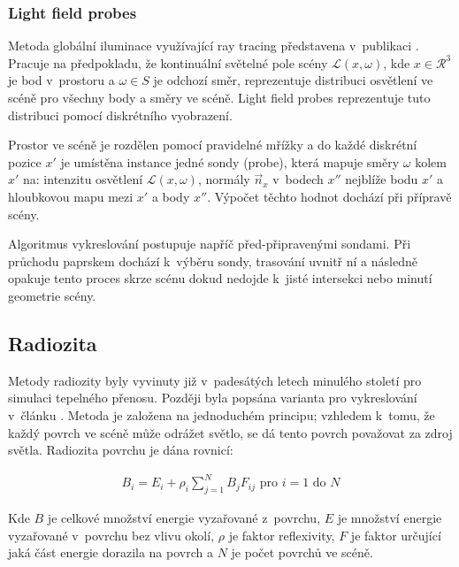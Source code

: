 \subsubsection{Light field probes} \label{sec:light_field_probes}
Metoda globální iluminace využívající ray tracing představena v~publikaci \cite{light_field_probes}. Pracuje na předpokladu, že kontinuální světelné pole scény $\mathcal{L}(x, \omega)$, kde $x \in \mathcal{R}^3$ je bod v~prostoru a $\omega \in S$ je odchozí směr, reprezentuje distribuci osvětlení ve scéně pro všechny body a směry ve scéně. Light field probes reprezentuje tuto distribuci pomocí diskrétního vyobrazení.

Prostor ve scéně je rozdělen pomocí pravidelné mřížky a do každé diskrétní pozice $x'$ je umístěna instance jedné sondy (probe), která mapuje směry $\omega$ kolem $x'$ na: intenzitu osvětlení $\mathcal{L}(x, \omega)$, normály $\vec{n}_x$ v~bodech $x''$ nejblíže bodu $x'$ a hloubkovou mapu mezi $x'$ a body $x''$. Výpočet těchto hodnot dochází při přípravě scény.

Algoritmus vykreslování postupuje napříč před-připravenými sondami. Při průchodu paprskem dochází k~výběru sondy, trasování uvnitř ní a následně opakuje tento proces skrze scénu dokud nedojde k~jisté intersekci nebo minutí geometrie scény.

\subsection{Radiozita}
Metody radiozity byly vyvinuty již v~padesátých letech minulého století pro simulaci tepelného přenosu. Později byla popsána varianta pro vykreslování v~článku \cite{radiosity}. Metoda je založena na jednoduchém principu; vzhledem k~tomu, že každý povrch ve scéně může odrážet světlo, se dá tento povrch považovat za zdroj světla. Radiozita povrchu je dána rovnicí:


\begin{equation} \label{eq:voxel_coords}
	\begin{gathered}
		B_i = E_i + \rho_i \sum^N_{j = 1}B_jF_{ij} \text{ pro } i = 1 \text{ do } N
	\end{gathered}
\end{equation}

Kde $B$ je celkové množství energie vyzařované z~povrchu, $E$ je množství energie vyzařované v~povrchu bez vlivu okolí, $\rho$ je faktor reflexivity, $F$ je faktor určující jaká část energie dorazila na povrch a $N$ je počet povrchů ve scéně.

